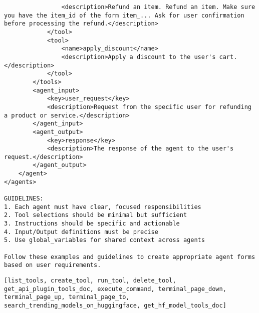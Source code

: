 \begin{lstlisting}
                <description>Refund an item. Refund an item. Make sure you have the item_id of the form item_... Ask for user confirmation before processing the refund.</description>
            </tool>
            <tool>
                <name>apply_discount</name>
                <description>Apply a discount to the user's cart.</description>
            </tool>
        </tools>
        <agent_input>
            <key>user_request</key>
            <description>Request from the specific user for refunding a product or service.</description>
        </agent_input>
        <agent_output>
            <key>response</key>
            <description>The response of the agent to the user's request.</description>
        </agent_output>
    </agent>
</agents>

GUIDELINES:
1. Each agent must have clear, focused responsibilities
2. Tool selections should be minimal but sufficient
3. Instructions should be specific and actionable
4. Input/Output definitions must be precise
5. Use global_variables for shared context across agents

Follow these examples and guidelines to create appropriate agent forms based on user requirements.
\end{lstlisting}

\begin{lstlisting}[basicstyle=\ttfamily\footnotesize, frame=none, columns=fullflexible, breaklines=true, breakatwhitespace=ture, breakindent=0pt, language=Tools, caption={Tools of \textbf{Tool Editor Agent}}, frame=shadowbox,xleftmargin=0.02\linewidth, xrightmargin=0.02\linewidth]
[list_tools, create_tool, run_tool, delete_tool, get_api_plugin_tools_doc, execute_command, terminal_page_down, terminal_page_up, terminal_page_to, search_trending_models_on_huggingface, get_hf_model_tools_doc]
\end{lstlisting}

